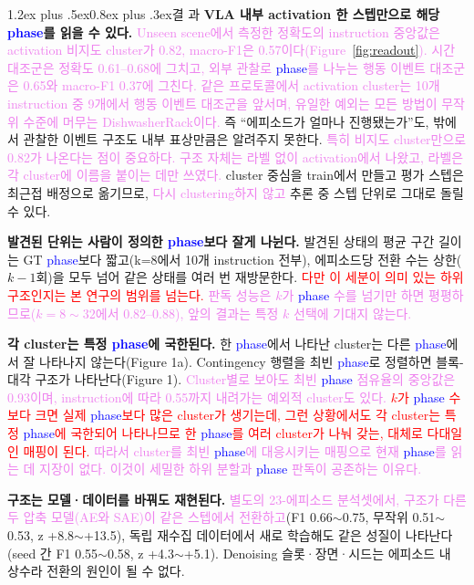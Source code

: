 \documentclass[a4paper,twocolumn,9pt]{extarticle}
\makeatletter
\newcommand{\new}[1]{\textcolor{red}{#1}}
\newcommand{\term}[1]{\textcolor{blue}{#1}}  %
\newcommand{\rev}[1]{\textcolor{violet}{#1}}  %
\renewcommand\section{\@startsection{section}{1}{\z@}%
  {1.2ex plus .5ex}{0.8ex plus .3ex}{\normalsize\bfseries}}
\makeatother
\begin{document}
\section{결 과}
\textbf{VLA 내부 activation 한 스텝만으로 해당 \term{phase}를 읽을 수 있다.} \rev{Unseen scene에서 측정한 정확도의 instruction 중앙값은 activation 비지도 cluster가 0.82, macro-F1은 0.57이다(Figure~\ref{fig:readout}). 시간 대조군은 정확도 0.61--0.68에 그치고, 외부 관찰로 \term{phase}를 나누는 행동 이벤트 대조군\cite{egsae}은 0.65와 macro-F1 0.37에 그친다.}
\rev{같은 프로토콜에서 activation cluster는 10개 instruction 중 9개에서 행동 이벤트 대조군을 앞서며, 유일한 예외는 모든 방법이 무작위 수준에 머무는 DishwasherRack이다.} 즉 ``에피소드가 얼마나 진행됐는가''도, 밖에서 관찰한 이벤트 구조도 내부 표상만큼은 알려주지 못한다. \rev{특히 비지도 cluster만으로 0.82가 나온다는 점이 중요하다. 구조 자체는 라벨 없이 activation에서 나왔고, 라벨은 각 cluster에 이름을 붙이는 데만 쓰였다.} cluster 중심을 train에서 만들고 평가 스텝은 최근접 배정으로 옮기므로, \rev{다시 clustering하지 않고} 추론 중 스텝 단위로 그대로 돌릴 수 있다.

\textbf{발견된 단위는 사람이 정의한 \term{phase}보다 잘게 나뉜다.} 발견된 상태의 평균 구간 길이는 GT \term{phase}보다 짧고(k=8에서 10개 instruction 전부), 에피소드당 전환 수는 상한($k-1$회)을 모두 넘어 같은 상태를 여러 번 재방문한다.
 \new{다만 이 세분이 의미 있는 하위 구조인지는 본 연구의 범위를 넘는다. \rev{판독 성능은 $k$가 \term{phase} 수를 넘기만 하면 평평하므로($k=8\sim32$에서 0.82--0.88), 앞의 결과는 특정 $k$ 선택에 기대지 않는다.}}

\textbf{각 cluster는 특정 \term{phase}에 국한된다.} 한 \term{phase}에서 나타난 cluster는 다른 \term{phase}에서 잘 나타나지 않는다(Figure 1a). Contingency 행렬을 최빈 \term{phase}로 정렬하면 블록-대각 구조가 나타난다(Figure 1). \rev{Cluster별로 보아도 최빈 \term{phase} 점유율의 중앙값은 0.93이며, instruction에 따라 0.55까지 내려가는 예외적 cluster도 있다.} \new{$k$가 \term{phase} 수보다 크면 실제 \term{phase}보다 많은 cluster가 생기는데, 그런 상황에서도 각 cluster는 특정 \term{phase}에 국한되어 나타나므로 한 \term{phase}를 여러 cluster가 나눠 갖는, 대체로 다대일인 매핑이 된다. \rev{따라서 cluster를 최빈 \term{phase}에 대응시키는 매핑으로 현재 \term{phase}를 읽는 데 지장이 없다. 이것이 세밀한 하위 분할과 \term{phase} 판독이 공존하는 이유다.}}

\textbf{구조는 모델·데이터를 바꿔도 재현된다.} \rev{별도의 23-에피소드 분석셋에서, 구조가 다른 두 압축 모델(AE와 SAE)이 같은 스텝에서 전환하고}(F1 0.66$\sim$0.75, 무작위 0.51$\sim$0.53, z +8.8$\sim$+13.5), 독립 재수집 데이터에서 새로 학습해도 같은 성질이 나타난다(seed 간 F1 0.55$\sim$0.58, z +4.3$\sim$+5.1). Denoising 슬롯·장면·시드는 에피소드 내 상수라 전환의 원인이 될 수 없다.
\end{document}
